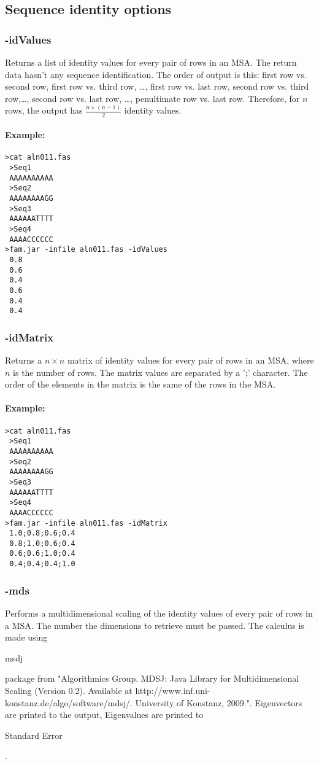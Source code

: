 \documentclass[a4paper, twoside,10pt]{article}
\begin{document}
\subsection{Sequence identity options}
\subsubsection{-idValues}
Returns a list of identity values for every pair of rows in an MSA. The return
data hasn't any sequence identification. The order of output is this:
first row vs. second row, first row vs. third row, \ldots , first row vs. last
row, second row vs. third row,\ldots, second row vs. last row, \ldots, 
penultimate row vs. last row. Therefore, for $n$ rows, the output has 
$\frac{n\times(n-1)}{2}$ identity values.   

\paragraph{Example:}
\begin{verbatim}
>cat aln011.fas
 >Seq1
 AAAAAAAAAA
 >Seq2
 AAAAAAAAGG
 >Seq3
 AAAAAATTTT
 >Seq4
 AAAACCCCCC
>fam.jar -infile aln011.fas -idValues 
 0.8
 0.6
 0.4
 0.6
 0.4
 0.4
\end{verbatim}

\subsubsection{-idMatrix}
Returns a $n\times n$ matrix of identity values for every pair of rows in an 
MSA, where $n$ is the number of rows. The matrix values are separated by a ';'
character. The order of the elements in the matrix is the same of the rows in 
the MSA.  

\paragraph{Example:}
\begin{verbatim}
>cat aln011.fas
 >Seq1
 AAAAAAAAAA
 >Seq2
 AAAAAAAAGG
 >Seq3
 AAAAAATTTT
 >Seq4
 AAAACCCCCC
>fam.jar -infile aln011.fas -idMatrix 
 1.0;0.8;0.6;0.4
 0.8;1.0;0.6;0.4
 0.6;0.6;1.0;0.4
 0.4;0.4;0.4;1.0
\end{verbatim}

\subsubsection{-mds}
Performs a multidimensional scaling of the identity values of every pair of rows
in a MSA. The number the dimensions to retrieve must be passed. The calculus is
made using \begin{tt}msdj\end{tt} package from "Algorithmics Group. 
MDSJ: Java Library for Multidimensional Scaling (Version 0.2). Available at 
http://www.inf.uni-konstanz.de/algo/software/mdsj/. University of Konstanz, 
2009.". Eigenvectors are printed to the output, Eigenvalues are printed to
\begin{tt}Standard Error\end{tt}.
\end{document}
